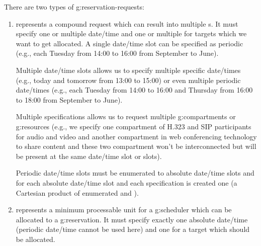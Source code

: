 There are two types of \glspl{g:reservation-request}:
\begin{enumerate}
\item {} represents a compound request which can result into multiple s. It must specify one or multiple date/time  and one or multiple  for targets which we want to get allocated. A single date/time slot can be specified as periodic (e.g., each Tuesday from 14:00 to 16:00 from September to June). 

Multiple date/time slots allows us to specify multiple specific date/times (e.g., today and tomorrow from 13:00 to 15:00) or even multiple periodic date/times (e.g., each Tuesday from 14:00 to 16:00 and Thursday from 16:00 to 18:00 from September to June).

Multiple specifications allows us to request multiple \glspl{g:compartment} or \glspl{g:resource} (e.g., we specify one compartment of H.323 and SIP participants for audio and video and another compartment in web conferencing technology to share content and these two compartment won't be interconnected but will be present at the same date/time slot or slots).

Periodic date/time slots must be enumerated to absolute date/time slots and for each absolute date/time slot and each specification is created one  (a Cartesian product of enumerated  and ).


\item {} represents a minimum processable unit for a \gls{g:scheduler} which can be allocated to a \gls{g:reservation}. It must specify exactly one absolute date/time  (periodic date/time cannot be used here) and one  for a target which should be allocated.
\end{enumerate}


